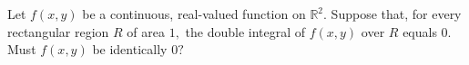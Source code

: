 Let $f(x,y)$ be a continuous, real-valued function on $\mathbb{R}^2.$ Suppose that, for every rectangular region $R$ of area $1,$ the double integral of $f(x,y)$ over $R$ equals $0.$ Must $f(x,y)$ be identically $0?$